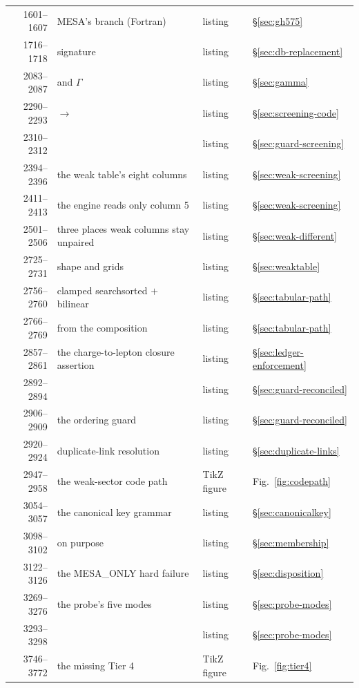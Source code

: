 \begin{longtable}{@{}r L{6.4cm} L{2.4cm} L{3.4cm}@{}}
1601--1607 & MESA's  branch (Fortran) & listing &
  \S\ref{sec:gh575} \\
1716--1718 &  signature & listing &
  \S\ref{sec:db-replacement} \\
2083--2087 &  and $\Gamma$ & listing & \S\ref{sec:gamma} \\
2290--2293 &  $\to$  & listing &
  \S\ref{sec:screening-code} \\
2310--2312 &  & listing &
  \S\ref{sec:guard-screening} \\
2394--2396 & the weak table's eight columns & listing &
  \S\ref{sec:weak-screening} \\
2411--2413 & the engine reads only column 5 & listing &
  \S\ref{sec:weak-screening} \\
2501--2506 & three places weak columns stay unpaired & listing &
  \S\ref{sec:weak-different} \\
2725--2731 &  shape and grids & listing &
  \S\ref{sec:weaktable} \\
2756--2760 & clamped searchsorted $+$ bilinear & listing &
  \S\ref{sec:tabular-path} \\
2766--2769 & \Ye{} from the composition & listing &
  \S\ref{sec:tabular-path} \\
2857--2861 & the charge-to-lepton closure assertion & listing &
  \S\ref{sec:ledger-enforcement} \\
2892--2894 &  & listing &
  \S\ref{sec:guard-reconciled} \\
2906--2909 & the ordering guard & listing & \S\ref{sec:guard-reconciled} \\
2920--2924 & duplicate-link resolution & listing &
  \S\ref{sec:duplicate-links} \\
2947--2958 & the weak-sector code path & TikZ figure &
  Fig.~\ref{fig:codepath} \\
3054--3057 & the canonical key grammar & listing &
  \S\ref{sec:canonicalkey} \\
3098--3102 &  on purpose & listing &
  \S\ref{sec:membership} \\
3122--3126 & the MESA\_ONLY hard failure & listing &
  \S\ref{sec:disposition} \\
3269--3276 & the probe's five modes & listing & \S\ref{sec:probe-modes} \\
3293--3298 &  & listing & \S\ref{sec:probe-modes} \\
3746--3772 & the missing Tier 4 & TikZ figure & Fig.~\ref{fig:tier4} \\
\end{longtable}
\endgroup

